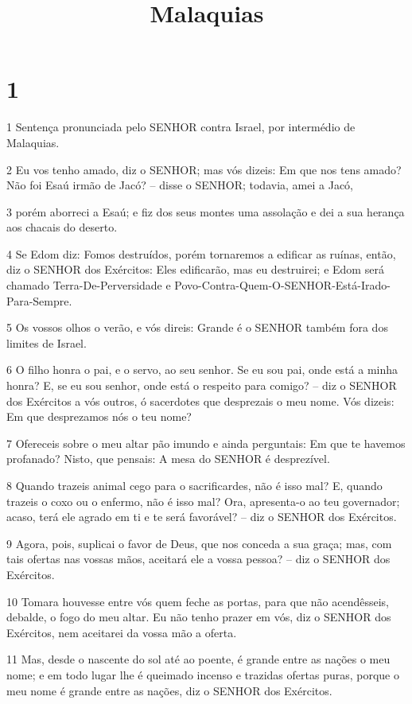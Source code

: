 

\title{Malaquias}


\chapter{1}

\par 1 Sentença pronunciada pelo SENHOR contra Israel, por intermédio de Malaquias.
\par 2 Eu vos tenho amado, diz o SENHOR; mas vós dizeis: Em que nos tens amado? Não foi Esaú irmão de Jacó? -- disse o SENHOR; todavia, amei a Jacó,
\par 3 porém aborreci a Esaú; e fiz dos seus montes uma assolação e dei a sua herança aos chacais do deserto.
\par 4 Se Edom diz: Fomos destruídos, porém tornaremos a edificar as ruínas, então, diz o SENHOR dos Exércitos: Eles edificarão, mas eu destruirei; e Edom será chamado Terra-De-Perversidade e Povo-Contra-Quem-O-SENHOR-Está-Irado-Para-Sempre.
\par 5 Os vossos olhos o verão, e vós direis: Grande é o SENHOR também fora dos limites de Israel.
\par 6 O filho honra o pai, e o servo, ao seu senhor. Se eu sou pai, onde está a minha honra? E, se eu sou senhor, onde está o respeito para comigo? -- diz o SENHOR dos Exércitos a vós outros, ó sacerdotes que desprezais o meu nome. Vós dizeis: Em que desprezamos nós o teu nome?
\par 7 Ofereceis sobre o meu altar pão imundo e ainda perguntais: Em que te havemos profanado? Nisto, que pensais: A mesa do SENHOR é desprezível.
\par 8 Quando trazeis animal cego para o sacrificardes, não é isso mal? E, quando trazeis o coxo ou o enfermo, não é isso mal? Ora, apresenta-o ao teu governador; acaso, terá ele agrado em ti e te será favorável? -- diz o SENHOR dos Exércitos.
\par 9 Agora, pois, suplicai o favor de Deus, que nos conceda a sua graça; mas, com tais ofertas nas vossas mãos, aceitará ele a vossa pessoa? -- diz o SENHOR dos Exércitos.
\par 10 Tomara houvesse entre vós quem feche as portas, para que não acendêsseis, debalde, o fogo do meu altar. Eu não tenho prazer em vós, diz o SENHOR dos Exércitos, nem aceitarei da vossa mão a oferta.
\par 11 Mas, desde o nascente do sol até ao poente, é grande entre as nações o meu nome; e em todo lugar lhe é queimado incenso e trazidas ofertas puras, porque o meu nome é grande entre as nações, diz o SENHOR dos Exércitos.
